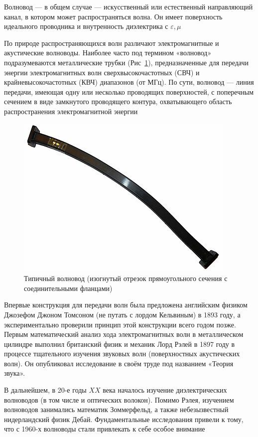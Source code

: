 \documentclass[a4paper, 14pt]{article}
\begin{document}
    Волновод — в общем случае — искусственный или естественный направляющий канал, в котором может распространяться
    волна.
    Он имеет поверхность идеального проводника и внутренность диэлектрика с $\varepsilon, \mu$
    
    По природе распространяющихся волн различают электромагнитные и акустические волноводы.
    Наиболее часто под термином «волновод» подразумеваются металлические трубки (Рис~\ref{1}), предназначенные для
    передачи энергии электромагнитных волн сверхвысокочастотных (СВЧ) и крайневысокочастотных (КВЧ) диапазонов (от МГц).
    По сути, волновод --- линия передачи, имеющая одну или несколько проводящих поверхностей, с поперечным сечением в
    виде замкнутого проводящего контура, охватывающего область распространения электромагнитной энергии
    
    \begin{figure}[h]
        \begin{center}
            \includegraphics[width = 0.5 \textwidth]{1}
            \caption{Типичный волновод (изогнутый отрезок прямоугольного сечения с соединительными фланцами)}
            \label{1}
        \end{center}
    \end{figure}
    
    Впервые конструкция для передачи волн была предложена английским физиком Джозефом Джоном Томсоном (не путать с
    лордом Кельвиным) в 1893 году, а экспериментально проверили принцип этой конструкции всего годом позже.
    Первым математический анализ хода электромагнитных волн в металлическом цилиндре выполнил британский физик и
    механик Лорд Рэлей в 1897 году в процессе тщательного изучения звуковых волн (поверхностных акустических волн).
    Он опубликовал исследование в своём труде под названием «Теория звука».
    
    В дальнейшем, в 20-е годы $XX$ века началось изучение диэлектрических волноводов (в том числе и оптических волокон).
    Помимо Рэлея, изучением волноводов занимались математик Зоммерфельд, а также небезызвестный нидерландский физик
    Дебай.
    Фундаментальные исследования привели к тому, что с 1960-х волноводы стали привлекать к себе особое
    внимание
    
\end{document}
